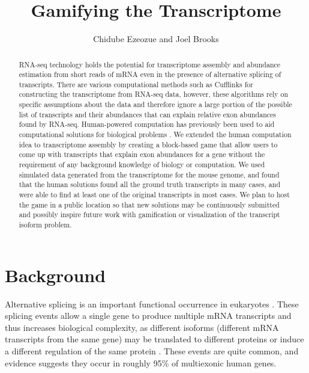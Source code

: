 \documentclass[12pt]{article}
\title{Gamifying the Transcriptome}
\author{Chidube Ezeozue and Joel Brooks}
\begin{document}

\renewcommand\refname{Bibliography}
\maketitle

\begin{abstract}

RNA-seq technology holds the potential for transcriptome assembly and abundance estimation from short reads of mRNA even in the presence of alternative splicing of transcripts. There are various computational methods such as Cufflinks \citep{trapnell2010transcript} for constructing the transcriptome from RNA-seq data, however, these algorithms rely on specific assumptions about the data and therefore ignore a large portion of the possible list of transcripts and their abundances that can explain relative exon abundances found by RNA-seq. Human-powered computation has previously been used to aid computational solutions for biological problems \citep{kawrykow2012phylo}. We extended the human computation idea to transcriptome assembly by
creating a block-based game that allow users to come up with transcripts that explain exon abundances for a gene without the requirement of any background knowledge of biology or computation. We used simulated data generated from the transcriptome for the mouse genome, and found that the human solutions found all the ground truth transcripts in many cases, and were able to find at least one of the original transcripts in most cases. We plan to host the game in a public location so that new solutions may be continuously submitted and possibly inspire future work with gamification or visualization of the transcript isoform problem.

\end{abstract}

\section*{Background}
Alternative splicing is an important functional occurrence in eukaryotes \citep{pan2008deep}. These splicing events allow a single gene to produce multiple mRNA transcripts and thus increases biological complexity, as different isoforms (different mRNA transcripts from the same gene) may be translated to different proteins or induce a different regulation of the same protein \citep{trapnell2010transcript}. These events are quite common, and evidence suggests they occur in roughly 95\% of multiexonic human genes.
\end{document}
